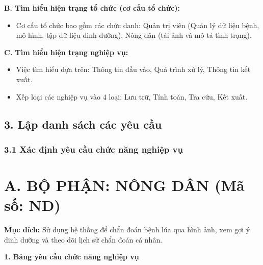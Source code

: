 \documentclass[12pt,a4paper]{article}
\begin{document}
\textbf{B. Tìm hiểu hiện trạng tổ chức (cơ cấu tổ chức):}
\begin{itemize}
    \item Cơ cấu tổ chức bao gồm các chức danh: Quản trị viên (Quản lý dữ liệu bệnh, mô hình, tập dữ liệu dinh dưỡng), Nông dân (tải ảnh và mô tả tình trạng).
\end{itemize}

\textbf{C. Tìm hiểu hiện trạng nghiệp vụ:}
\begin{itemize}
    \item Việc tìm hiểu dựa trên: Thông tin đầu vào, Quá trình xử lý, Thông tin kết xuất.
    \item Xếp loại các nghiệp vụ vào 4 loại: Lưu trữ, Tính toán, Tra cứu, Kết xuất.
\end{itemize}

\hrulefill

\subsection*{3. Lập danh sách các yêu cầu}
\subsubsection*{3.1 Xác định yêu cầu chức năng nghiệp vụ}

\section*{A. BỘ PHẬN: NÔNG DÂN (Mã số: ND)}

\textbf{Mục đích:} Sử dụng hệ thống để chẩn đoán bệnh lúa qua hình ảnh, xem gợi ý dinh dưỡng và theo dõi lịch sử chẩn đoán cá nhân.

\vspace{0.3cm}
\textbf{1. Bảng yêu cầu chức năng nghiệp vụ}
\end{document}

